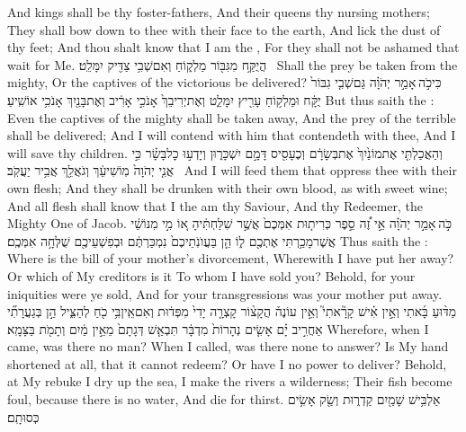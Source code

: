 {And kings shall be thy foster-fathers, And their queens thy nursing mothers; They shall bow down to thee with their face to the earth, And lick the dust of thy feet; And thou shalt know that I am the \lord, For they shall not be ashamed that wait for Me.}
{הֲיֻקַּ֥ח מִגִּבּ֖וֹר מַלְק֑וֹחַ וְאִם\maqqaf שְׁבִ֥י צַדִּ֖יק יִמָּלֵֽט׃ \setuma }
{Shall the prey be taken from the mighty, Or the captives of the victorious be delivered?}
{כִּי\maqqaf כֹ֣ה \legarmeh  אָמַ֣ר יְהֹוָ֗ה גַּם\maqqaf שְׁבִ֤י גִבּוֹר֙ יֻקָּ֔ח וּמַלְק֥וֹחַ עָרִ֖יץ יִמָּלֵ֑ט וְאֶת\maqqaf יְרִיבֵךְ֙ אָנֹכִ֣י אָרִ֔יב וְאֶת\maqqaf בָּנַ֖יִךְ אָנֹכִ֥י אוֹשִֽׁיעַ׃}
{But thus saith the \lord: Even the captives of the mighty shall be taken away, And the prey of the terrible shall be delivered; And I will contend with him that contendeth with thee, And I will save thy children.}
{וְהַאֲכַלְתִּ֤י אֶת\maqqaf מוֹנַ֙יִךְ֙ אֶת\maqqaf בְּשָׂרָ֔ם וְכֶעָסִ֖יס דָּמָ֣ם יִשְׁכָּר֑וּן וְיָדְע֣וּ כׇל\maqqaf בָּשָׂ֗ר כִּ֣י אֲנִ֤י יְהֹוָה֙ מֽוֹשִׁיעֵ֔ךְ וְגֹאֲלֵ֖ךְ אֲבִ֥יר יַעֲקֹֽב׃ \setuma }
{And I will feed them that oppress thee with their own flesh; And they shall be drunken with their own blood, as with sweet wine; And all flesh shall know that I the \lord\space am thy Saviour, And thy Redeemer, the Mighty One of Jacob.}
\newperek
{}
{כֹּ֣ה \legarmeh  אָמַ֣ר יְהֹוָ֗ה אֵ֣י זֶ֠ה סֵ֣פֶר כְּרִית֤וּת אִמְּכֶם֙ אֲשֶׁ֣ר שִׁלַּחְתִּ֔יהָ א֚וֹ מִ֣י מִנּוֹשַׁ֔י אֲשֶׁר\maqqaf מָכַ֥רְתִּי אֶתְכֶ֖ם ל֑וֹ הֵ֤ן בַּעֲוֺנֹֽתֵיכֶם֙ נִמְכַּרְתֶּ֔ם וּבְפִשְׁעֵיכֶ֖ם שֻׁלְּחָ֥ה אִמְּכֶֽם׃}
{Thus saith the \lord: Where is the bill of your mother’s divorcement, Wherewith I have put her away? Or which of My creditors is it To whom I have sold you? Behold, for your iniquities were ye sold, And for your transgressions was your mother put away.}
{מַדּ֨וּעַ בָּ֜אתִי וְאֵ֣ין אִ֗ישׁ קָרָ֘אתִי֮ וְאֵ֣ין עוֹנֶה֒ הֲקָצ֨וֹר קָצְרָ֤ה יָדִי֙ מִפְּד֔וּת וְאִם\maqqaf אֵֽין\maqqaf בִּ֥י כֹ֖חַ לְהַצִּ֑יל הֵ֣ן בְּגַעֲרָתִ֞י אַחֲרִ֣יב יָ֗ם אָשִׂ֤ים נְהָרוֹת֙ מִדְבָּ֔ר תִּבְאַ֤שׁ דְּגָתָם֙ מֵאֵ֣ין מַ֔יִם וְתָמֹ֖ת בַּצָּמָֽא׃}
{Wherefore, when I came, was there no man? When I called, was there none to answer? Is My hand shortened at all, that it cannot redeem? Or have I no power to deliver? Behold, at My rebuke I dry up the sea, I make the rivers a wilderness; Their fish become foul, because there is no water, And die for thirst.}
{אַלְבִּ֥ישׁ שָׁמַ֖יִם קַדְר֑וּת וְשַׂ֖ק אָשִׂ֥ים כְּסוּתָֽם׃ \petucha }
